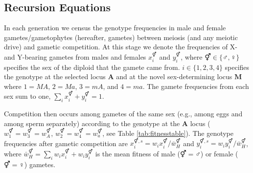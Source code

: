 \documentclass[12pt]{article}
\begin{document}
\subsection*{Recursion Equations}
\label{app:recurs}


In each generation we census the genotype frequencies in male and female gametes/gametophytes (hereafter, gametes) between meiosis (and any meiotic drive) and gametic competition. 
At this stage we denote the frequencies of X- and Y-bearing gametes from males and females $x_{i}^{\Hermaphrodite}$ and $y_{i}^{\Hermaphrodite}$, where $\Hermaphrodite \in \{\male,\female\}$ specifies the sex of the diploid that the gamete came from. 
$i\in\{1,2,3,4\}$ specifies the genotype at the selected locus $\mathbf{A}$ and at the novel sex-determining locus $\mathbf{M}$ where $1=MA$, $2=Ma$, $3=mA$, and $4=ma$. 
The gamete frequencies from each sex sum to one, $\sum_{i}x_{i}^{\Hermaphrodite}+y_{i}^{\Hermaphrodite}=1$. 

Competition then occurs among gametes of the same sex (e.g., among eggs and among sperm separately) according to the genotype at the \textbf{A} locus ($w_{1}^\Hermaphrodite=w_{3}^\Hermaphrodite=w_{A}^\Hermaphrodite$, $w_{2}^\Hermaphrodite=w_{4}^\Hermaphrodite=w_{a}^\Hermaphrodite$, see Table \ref{tab:fitnesstable}).
The genotype frequencies after gametic competition are $x_{i}^{\Hermaphrodite,s}= w_{i}x_{i}^{\Hermaphrodite}/\bar{w}_{H}^{\Hermaphrodite}$ and $y_{i}^{\Hermaphrodite,s}= w_{i}y_{i}^{\Hermaphrodite}/\bar{w}_{H}^{\Hermaphrodite}$, where $\bar{w}_{H}^{\Hermaphrodite}=\sum_{i} w_{i}x_{i}^{\Hermaphrodite}+w_{i}y_{i}^{\Hermaphrodite}$ is the mean fitness of male ($\Hermaphrodite=\male$) or female ($\Hermaphrodite=\female$) gametes. 
\end{document}
